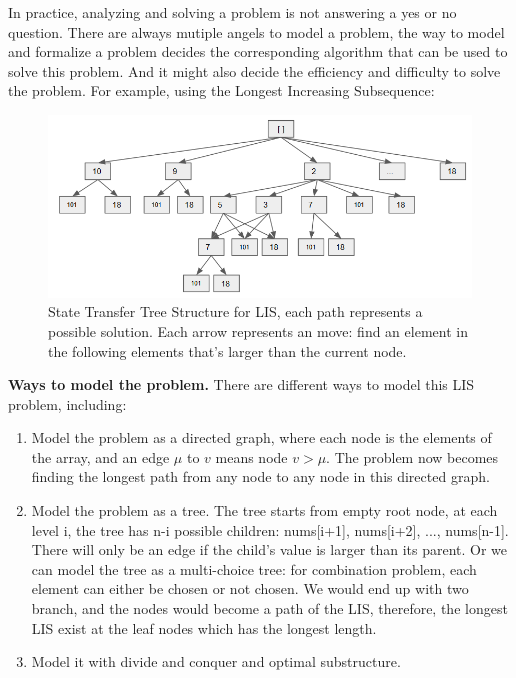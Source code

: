 \documentclass[../main.tex]{subfiles}
\begin{document}
In practice, analyzing and solving a problem is not answering a yes or no question. There are always mutiple angels to model a problem, the way to model and formalize a problem decides the corresponding algorithm that can be used to solve this problem. And it might also decide the efficiency and difficulty to solve the problem. For example, using the Longest Increasing Subsequence:
\begin{figure}[h]
    \centering
    \includegraphics[width=\columnwidth]{fig/LIS_tree.png}
    \caption{State Transfer Tree Structure for LIS, each path represents a possible solution. Each arrow represents an move: find an element in the following elements that's larger than the current node.}
    \label{fig:tree_lis}
\end{figure}
\textbf{Ways to model the problem.} There are different ways to model this LIS problem, including:
\begin{enumerate}
    \item Model the problem as a directed graph, where each node is the elements of the array, and an edge $\mu$ to $v$ means node $v>\mu$. The problem now becomes finding the longest path from any node to any node in this directed graph.  
    \item Model the problem as a tree. The tree starts from empty root node, at each level i, the tree has n-i possible children: nums[i+1], nums[i+2], ..., nums[n-1]. There will only be an edge if the child's value is larger than its parent. Or we can model the tree as a multi-choice tree: for combination problem, each element can either be chosen or not chosen. We would end up with two branch, and the nodes would become a path of the LIS, therefore, the longest LIS exist at the leaf nodes which has the longest length.
    \item Model it with divide and conquer and optimal substructure. 
\end{enumerate}
\end{document}
